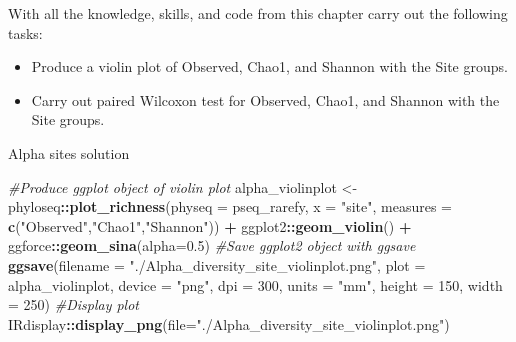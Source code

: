 \documentclass[
]{book}
\newenvironment{Shaded}{\begin{snugshade}}{\end{snugshade}}
\newcommand{\AttributeTok}[1]{\textcolor[rgb]{0.13,0.29,0.53}{#1}}
\newcommand{\CommentTok}[1]{\textcolor[rgb]{0.56,0.35,0.01}{\textit{#1}}}
\newcommand{\DecValTok}[1]{\textcolor[rgb]{0.00,0.00,0.81}{#1}}
\newcommand{\FloatTok}[1]{\textcolor[rgb]{0.00,0.00,0.81}{#1}}
\newcommand{\FunctionTok}[1]{\textcolor[rgb]{0.13,0.29,0.53}{\textbf{#1}}}
\newcommand{\NormalTok}[1]{#1}
\newcommand{\OtherTok}[1]{\textcolor[rgb]{0.56,0.35,0.01}{#1}}
\newcommand{\SpecialCharTok}[1]{\textcolor[rgb]{0.81,0.36,0.00}{\textbf{#1}}}
\newcommand{\StringTok}[1]{\textcolor[rgb]{0.31,0.60,0.02}{#1}}
\providecommand{\tightlist}{%
  \setlength{\itemsep}{0pt}\setlength{\parskip}{0pt}}
\begin{document}
With all the knowledge, skills, and code from this chapter carry out the following tasks:

\begin{itemize}
\tightlist
\item
  Produce a violin plot of Observed, Chao1, and Shannon with the Site groups.
\item
  Carry out paired Wilcoxon test for Observed, Chao1, and Shannon with the Site groups.
\end{itemize}

Alpha sites solution

\begin{Shaded}
\begin{Highlighting}[]
\CommentTok{\#Produce ggplot object of violin plot}
\NormalTok{alpha\_violinplot }\OtherTok{\textless{}{-}}\NormalTok{ phyloseq}\SpecialCharTok{::}\FunctionTok{plot\_richness}\NormalTok{(}\AttributeTok{physeq =}\NormalTok{ pseq\_rarefy, }
                        \AttributeTok{x =} \StringTok{"site"}\NormalTok{,}
                        \AttributeTok{measures =} \FunctionTok{c}\NormalTok{(}\StringTok{"Observed"}\NormalTok{,}\StringTok{"Chao1"}\NormalTok{,}\StringTok{"Shannon"}\NormalTok{)) }\SpecialCharTok{+}
\NormalTok{                          ggplot2}\SpecialCharTok{::}\FunctionTok{geom\_violin}\NormalTok{() }\SpecialCharTok{+}
\NormalTok{                          ggforce}\SpecialCharTok{::}\FunctionTok{geom\_sina}\NormalTok{(}\AttributeTok{alpha=}\FloatTok{0.5}\NormalTok{)}
\CommentTok{\#Save ggplot2 object with ggsave}
\FunctionTok{ggsave}\NormalTok{(}\AttributeTok{filename =} \StringTok{"./Alpha\_diversity\_site\_violinplot.png"}\NormalTok{, }\AttributeTok{plot =}\NormalTok{ alpha\_violinplot,}
       \AttributeTok{device =} \StringTok{"png"}\NormalTok{, }\AttributeTok{dpi =} \DecValTok{300}\NormalTok{, }\AttributeTok{units =} \StringTok{"mm"}\NormalTok{, }\AttributeTok{height =} \DecValTok{150}\NormalTok{, }\AttributeTok{width =} \DecValTok{250}\NormalTok{)}
\CommentTok{\#Display plot}
\NormalTok{IRdisplay}\SpecialCharTok{::}\FunctionTok{display\_png}\NormalTok{(}\AttributeTok{file=}\StringTok{"./Alpha\_diversity\_site\_violinplot.png"}\NormalTok{)}
\end{Highlighting}
\end{Shaded}

\begin{Shaded}
\end{Shaded}
\end{document}
